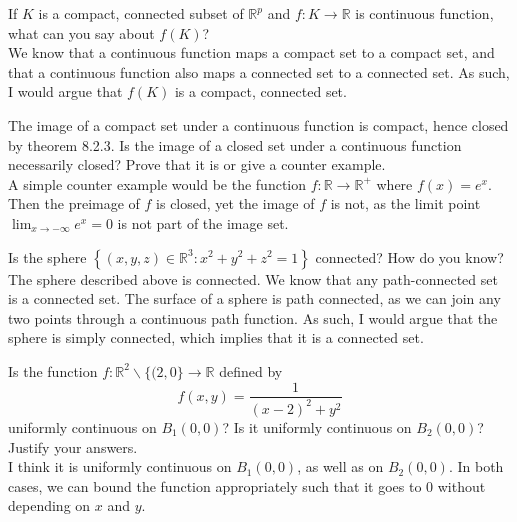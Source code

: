 \documentclass[12pt]{book}
\newcommand{\R}{\mathbb{R}}
\newenvironment{exercise}[2][Exercise]{\begin{trivlist}
\item[\hskip \labelsep {\bfseries #1}\hskip \labelsep {\bfseries #2.}]}{\end{trivlist}}
\begin{document}
\begin{exercise}{8.2.3}
If $K$ is a compact, connected subset of $\R^p$ and $f:K \to \R$ is continuous function, what can you say about $f(K)$? \\

We know that a continuous function maps a compact set to a compact set, and that a continuous function also maps a connected set to a connected set. As such, I would argue that $f(K)$ is a compact, connected set.
\end{exercise}



\begin{exercise}{8.2.5}
The image of a compact set under a continuous function is compact, hence closed by theorem 8.2.3. Is the image of a closed set under a continuous function necessarily closed? Prove that it is or give a counter example.  \\

A simple counter example would be the function $f:\R \to \R^+$ where $f(x) = e^x$. Then the preimage of $f$ is closed, yet the image of $f$ is not, as the limit point $\lim_{x \to -\infty} e^x = 0$ is not part of the image set. 
\end{exercise}



\begin{exercise}{8.2.7}
Is the sphere $\left\{ (x,y,z) \in \R^3 : x^2 + y^2 + z^2 =1 \right\}$ connected? How do you know? \\

The sphere described above is connected. We know that any path-connected set is a connected set. The surface of a sphere is path connected, as we can join any two points through a continuous path function. As such, I would argue that the sphere is simply connected, which implies that it is a connected set.
\end{exercise}



\begin{exercise}{8.2.10}
Is the function $f: \R^2 \backslash \{ (2,0 \} \to \R$ defined  by
    \[ f(x,y) = \frac{1}{(x-2)^2 + y^2} \]
uniformly continuous on $B_1(0,0)$? Is it uniformly continuous on $B_2(0,0)$? Justify your answers. \\

I think it is uniformly continuous on $B_1 (0,0)$, as well as on $B_2 (0,0)$. In both cases, we can bound the function appropriately such that it goes to 0 without depending on $x$ and $y$.
\end{exercise}
\end{document}
